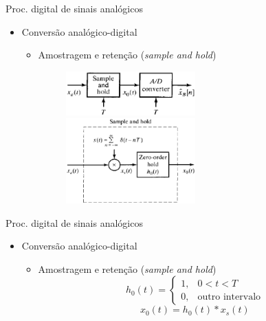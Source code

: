 \documentclass[
size=11pt,
paper=screen,
mode=present,
display=slidesnotes,
style=paintings,
nopagebreaks,
blackslide,
fleqn]{powerdot}
\begin{document}
\begin{slide}{Proc. digital de sinais anal\'ogicos}
\begin{itemize}
   \item Conversão analógico-digital
   \begin{itemize}
      \item Amostragem e retenção (\emph{sample and hold})
      \begin{figure}
         \centering
          \includegraphics[width = 0.5\textwidth]{figs/ad_conv1.eps}
          \includegraphics[width = 0.5\textwidth]{figs/ad_conv2.eps}
      \end{figure}

   \end{itemize}
\end{itemize}
\end{slide}

\begin{slide}{Proc. digital de sinais anal\'ogicos}
\begin{itemize}
   \item Conversão analógico-digital
   \begin{itemize}
      \item Amostragem e retenção (\emph{sample and hold})
      \begin{equation}
          h_0(t) = \begin{cases} 1, & 0<t<T\\0, & \text{outro intervalo}\end{cases}
      \end{equation}
      \begin{equation}
          x_0(t) = h_0(t)\ast x_s(t)
      \end{equation}
   \end{itemize}
\end{itemize}
\end{slide}
\end{document}
